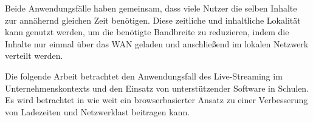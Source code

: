 Beide Anwendungsfälle haben gemeinsam, dass viele Nutzer die selben Inhalte zur annähernd gleichen Zeit benötigen. Diese zeitliche und inhaltliche Lokalität kann genutzt werden, um die benötigte Bandbreite zu reduzieren, indem die Inhalte nur einmal über das WAN geladen und anschließend im lokalen Netzwerk verteilt werden.

Die folgende Arbeit betrachtet den Anwendungsfall des Live-Streaming im Unternehmenskontexts und den Einsatz von unterstützender Software in Schulen. Es wird betrachtet in wie weit ein browserbasierter \pTp Ansatz zu einer Verbesserung von Ladezeiten und Netzwerklast beitragen kann.



\section{\schulCloud}

